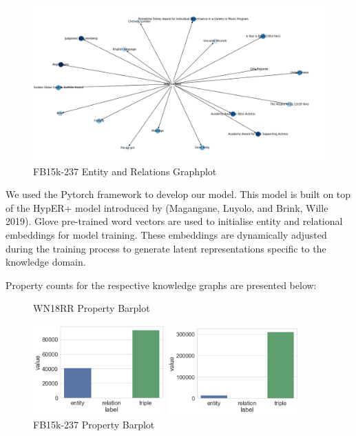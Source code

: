 \begin{figure}[H]
  	\caption{FB15k-237 Entity and Relations Graphplot}
   	\centering
    	\includegraphics[width=\textwidth]{FB15k-237_Graph}
\end{figure} \newpage

We used the Pytorch framework to develop our model. This model is built on top of the HypER+ model introduced by (Magangane, Luyolo, and Brink, Wille 2019).  Glove pre-trained word vectors are used to initialise entity and relational embeddings for model training. These embeddings are dynamically adjusted during the training process to generate latent representations specific to the knowledge domain. \bigskip

Property counts for the respective knowledge graphs are presented below:

\begin{figure}[H]
	\parbox{.5\linewidth}{
   		\caption{WN18RR Property Barplot}
   		\centering
    		\includegraphics[width=0.45\textwidth]{WN18RR_Counts}
		}
	\hfill
	\parbox{.5\linewidth}{
		\caption{FB15k-237 Property Barplot}
   		\centering
    		\includegraphics[width=0.45\textwidth]{FB15k-237_Counts}
		}
\end{figure}

